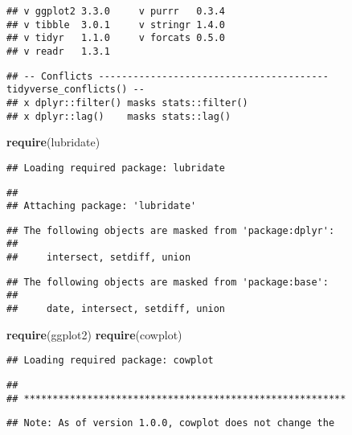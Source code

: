 \documentclass[
]{article}
\newenvironment{Shaded}{\begin{snugshade}}{\end{snugshade}}
\newcommand{\KeywordTok}[1]{\textcolor[rgb]{0.13,0.29,0.53}{\textbf{#1}}}
\newcommand{\NormalTok}[1]{#1}
\begin{document}
\begin{verbatim}
## v ggplot2 3.3.0     v purrr   0.3.4
## v tibble  3.0.1     v stringr 1.4.0
## v tidyr   1.1.0     v forcats 0.5.0
## v readr   1.3.1
\end{verbatim}

\begin{verbatim}
## -- Conflicts ---------------------------------------- tidyverse_conflicts() --
## x dplyr::filter() masks stats::filter()
## x dplyr::lag()    masks stats::lag()
\end{verbatim}

\begin{Shaded}
\begin{Highlighting}[]
\KeywordTok{require}\NormalTok{(lubridate)}
\end{Highlighting}
\end{Shaded}

\begin{verbatim}
## Loading required package: lubridate
\end{verbatim}

\begin{verbatim}
## 
## Attaching package: 'lubridate'
\end{verbatim}

\begin{verbatim}
## The following objects are masked from 'package:dplyr':
## 
##     intersect, setdiff, union
\end{verbatim}

\begin{verbatim}
## The following objects are masked from 'package:base':
## 
##     date, intersect, setdiff, union
\end{verbatim}

\begin{Shaded}
\begin{Highlighting}[]
\KeywordTok{require}\NormalTok{(ggplot2)}
\KeywordTok{require}\NormalTok{(cowplot)}
\end{Highlighting}
\end{Shaded}

\begin{verbatim}
## Loading required package: cowplot
\end{verbatim}

\begin{verbatim}
## 
## ********************************************************
\end{verbatim}

\begin{verbatim}
## Note: As of version 1.0.0, cowplot does not change the
\end{verbatim}
\end{document}
